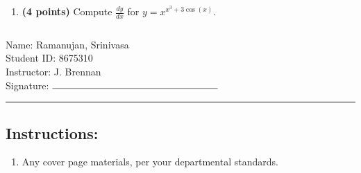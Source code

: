 \documentclass[12pt]{amsart}
\begin{document}
\begin{enumerate}
\vfill 
\def \varexp{3}\def \newexp{2}\def \trigcoeff{3}\def \trigval{+3}\def \oppval{-3}
\item {\bf (4 points)} 
 Compute $\frac{dy}{dx}$ for $y=x^{x^\varexp \trigval \cos(x)}$.

\vfill 
\newpage  $ $   \newpage\end{enumerate}\graphicspath{{C:/Users/iainc/anaconda3/Randomizer/MATH 1001/Midterm 1/}}\setcounter{page}{1}


\thispagestyle{fancy}

 \noindent Name: Ramanujan, Srinivasa \vspace{.3cm} \\\noindent Student ID: 8675310 \vspace{.3cm} \\\noindent Instructor: J. Brennan \vspace{.3cm} \\\noindent Signature: $\rule{6cm}{0.15mm}$ \vspace{.3cm} \\ 



\vspace{.4cm}


\vspace{.4cm}

\hrule

\subsection*{Instructions:} \begin{enumerate}[1.]
\item Any cover page materials, per your departmental standards.
\end{enumerate}
\end{document}
